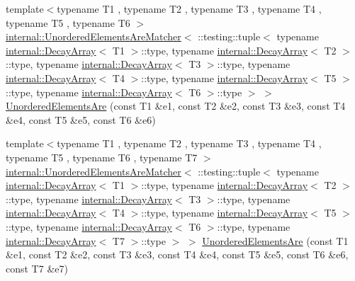 \begin{DoxyCompactItemize}
\item 
{\footnotesize template$<$typename T1 , typename T2 , typename T3 , typename T4 , typename T5 , typename T6 $>$ }\\\hyperlink{classtesting_1_1internal_1_1_unordered_elements_are_matcher}{internal\+::\+Unordered\+Elements\+Are\+Matcher}$<$ \+::testing\+::tuple$<$ typename \hyperlink{structtesting_1_1internal_1_1_decay_array}{internal\+::\+Decay\+Array}$<$ T1 $>$\+::type, typename \hyperlink{structtesting_1_1internal_1_1_decay_array}{internal\+::\+Decay\+Array}$<$ T2 $>$\+::type, typename \hyperlink{structtesting_1_1internal_1_1_decay_array}{internal\+::\+Decay\+Array}$<$ T3 $>$\+::type, typename \hyperlink{structtesting_1_1internal_1_1_decay_array}{internal\+::\+Decay\+Array}$<$ T4 $>$\+::type, typename \hyperlink{structtesting_1_1internal_1_1_decay_array}{internal\+::\+Decay\+Array}$<$ T5 $>$\+::type, typename \hyperlink{structtesting_1_1internal_1_1_decay_array}{internal\+::\+Decay\+Array}$<$ T6 $>$\+::type $>$ $>$ \hyperlink{namespacetesting_aff1859501ecd94dd1bc428d146a66fdc}{Unordered\+Elements\+Are} (const T1 \&e1, const T2 \&e2, const T3 \&e3, const T4 \&e4, const T5 \&e5, const T6 \&e6)
\item 
{\footnotesize template$<$typename T1 , typename T2 , typename T3 , typename T4 , typename T5 , typename T6 , typename T7 $>$ }\\\hyperlink{classtesting_1_1internal_1_1_unordered_elements_are_matcher}{internal\+::\+Unordered\+Elements\+Are\+Matcher}$<$ \+::testing\+::tuple$<$ typename \hyperlink{structtesting_1_1internal_1_1_decay_array}{internal\+::\+Decay\+Array}$<$ T1 $>$\+::type, typename \hyperlink{structtesting_1_1internal_1_1_decay_array}{internal\+::\+Decay\+Array}$<$ T2 $>$\+::type, typename \hyperlink{structtesting_1_1internal_1_1_decay_array}{internal\+::\+Decay\+Array}$<$ T3 $>$\+::type, typename \hyperlink{structtesting_1_1internal_1_1_decay_array}{internal\+::\+Decay\+Array}$<$ T4 $>$\+::type, typename \hyperlink{structtesting_1_1internal_1_1_decay_array}{internal\+::\+Decay\+Array}$<$ T5 $>$\+::type, typename \hyperlink{structtesting_1_1internal_1_1_decay_array}{internal\+::\+Decay\+Array}$<$ T6 $>$\+::type, typename \hyperlink{structtesting_1_1internal_1_1_decay_array}{internal\+::\+Decay\+Array}$<$ T7 $>$\+::type $>$ $>$ \hyperlink{namespacetesting_add6e16fe24c45e39e92c0d19c04acf11}{Unordered\+Elements\+Are} (const T1 \&e1, const T2 \&e2, const T3 \&e3, const T4 \&e4, const T5 \&e5, const T6 \&e6, const T7 \&e7)
\item 

\end{DoxyCompactItemize}
